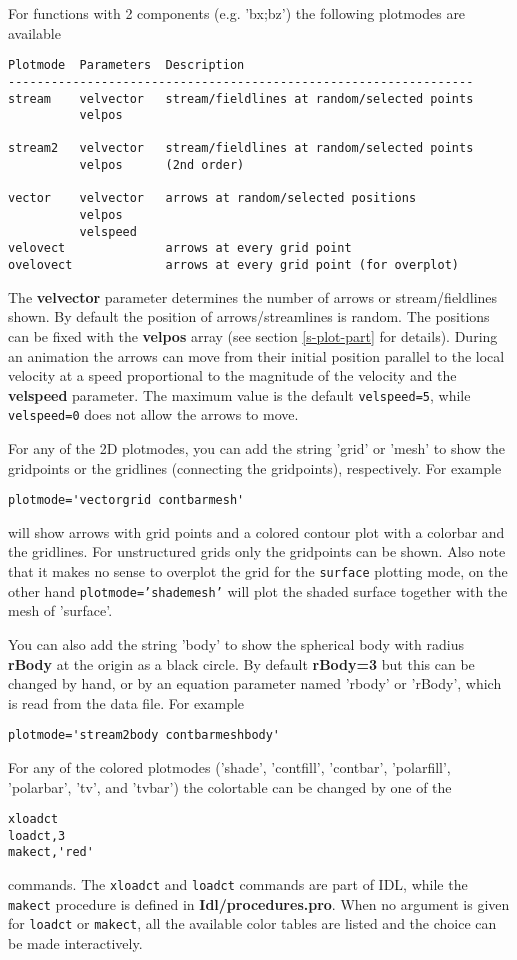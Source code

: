    For functions with 2 components (e.g. 'bx;bz') the following plotmodes
   are available
\begin{verbatim}
Plotmode  Parameters  Description
-----------------------------------------------------------------
stream    velvector   stream/fieldlines at random/selected points
          velpos      

stream2   velvector   stream/fieldlines at random/selected points
          velpos      (2nd order)

vector    velvector   arrows at random/selected positions
          velpos
          velspeed
velovect              arrows at every grid point
ovelovect             arrows at every grid point (for overplot)
\end{verbatim}
   The {\bf velvector} parameter determines the number of arrows or
   stream/fieldlines shown. By default the position of arrows/streamlines
   is random. The positions can be fixed with the {\bf velpos} array
   (see section \ref{s-plot-part} for details). 
   During an animation the arrows can move from their initial position
   parallel to the local velocity at a speed proportional to the magnitude
   of the velocity and the {\bf velspeed} parameter. The maximum value
   is the default {\tt velspeed=5}, while {\tt velspeed=0} does not allow
   the arrows to move. 

   For any of the 2D plotmodes, you can add the string 'grid' or 'mesh'
   to show the gridpoints or the gridlines (connecting the gridpoints), 
   respectively. For example 
\begin{verbatim}
plotmode='vectorgrid contbarmesh'
\end{verbatim} 
   will show arrows with grid points and 
   a colored contour plot with a colorbar and the gridlines.
   For unstructured grids only the gridpoints can be shown.
   Also note that it makes no sense to overplot the grid for the 
   {\tt surface} plotting mode, on the other hand {\tt plotmode='shademesh'}
   will plot the shaded surface together with the mesh of 'surface'.

   You can also add the string 'body' to show the spherical body with
   radius {\bf rBody} at the origin as a black circle. By default 
   {\bf rBody=3} but this can be changed by hand, or by an equation
   parameter named 'rbody' or 'rBody', which is read from the data file.
   For example
\begin{verbatim}
plotmode='stream2body contbarmeshbody'
\end{verbatim}
   For any of the colored plotmodes ('shade', 'contfill', 'contbar', 
   'polarfill', 'polarbar', 'tv', and 'tvbar') the colortable can be 
   changed by one of the 
\begin{verbatim}
xloadct
loadct,3
makect,'red'
\end{verbatim}
   commands. The {\tt xloadct} and {\tt loadct} commands are part of IDL, while
   the {\tt makect} procedure is defined in {\bf Idl/procedures.pro}.
   When no argument is given for {\tt loadct} or {\tt makect}, 
   all the available color tables are listed
   and the choice can be made interactively.

